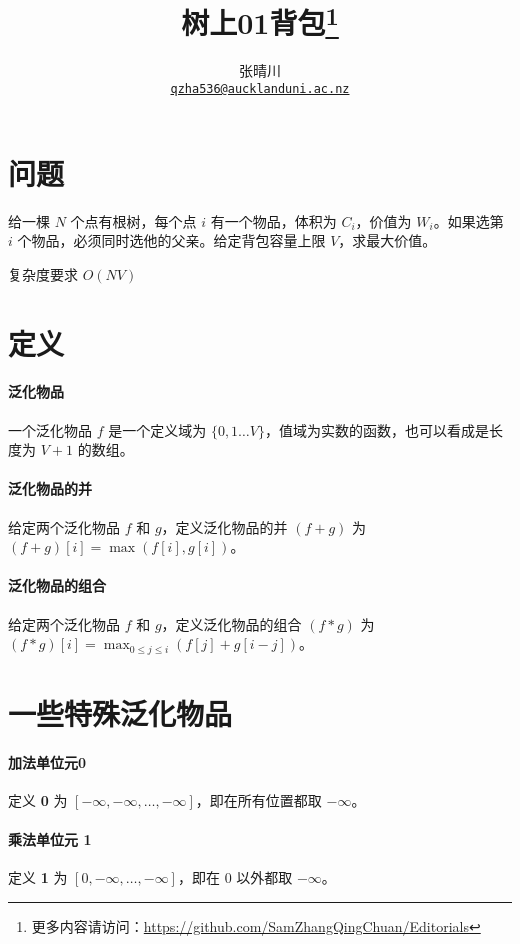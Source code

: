 \documentclass{article}
\title{树上01背包\footnote{更多内容请访问：\url{https://github.com/SamZhangQingChuan/Editorials}}}
\author{张晴川\\\href{mailto:qzha536@aucklanduni.ac.nz}{\texttt{qzha536@aucklanduni.ac.nz}}}
\begin{document}
\maketitle

\section{问题}
给一棵 $N$ 个点有根树，每个点 $i$ 有一个物品，体积为 $C_i$，价值为 $W_i$。如果选第 $i$ 个物品，必须同时选他的父亲。给定背包容量上限 $V$，求最大价值。

复杂度要求 $O(NV)$

\section{定义}

\paragraph{泛化物品}
一个泛化物品 $f$ 是一个定义域为 $\{0,1\ldots V\}$，值域为实数的函数，也可以看成是长度为 $V+1$ 的数组。

\paragraph{泛化物品的并}
给定两个泛化物品 $f$ 和 $g$，定义泛化物品的并 $(f+g)$ 为 $(f+g)[i] = \max(f[i],g[i])$。

\paragraph{泛化物品的组合}
给定两个泛化物品 $f$ 和 $g$，定义泛化物品的组合 $(f*g)$ 为 $(f*g)[i] = \max_{0\le j \le i}(f[j]+g[i-j])$。

\section{一些特殊泛化物品}

\paragraph{加法单位元\textbf{0}}
定义 \textbf{0} 为 $[-\infty,-\infty,\ldots,-\infty ]$，即在所有位置都取 $-\infty$。

\paragraph{乘法单位元 \textbf{1}}
定义 \textbf{1} 为 $[0,-\infty,\ldots,-\infty ]$，即在 $0$ 以外都取 $-\infty$。
\end{document}
